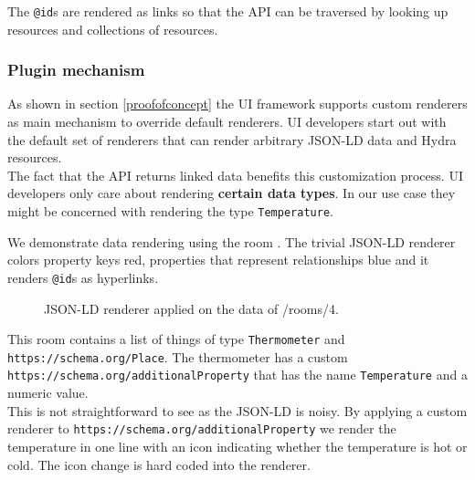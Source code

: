 The \lstinline{@id}s are rendered as links so that the API can be traversed by looking up resources and collections of resources.

\subsubsection{Plugin mechanism}\label{pluginmechanism}
As shown in section \ref{proofofconcept} the UI framework supports custom renderers as main mechanism to override default renderers. UI developers start out with the default set of renderers that can render arbitrary JSON-LD data and Hydra resources. \\
The fact that the API returns linked data benefits this customization process. UI developers only care about rendering \textbf{certain data types}. In our use case they might be concerned with rendering the type \lstinline{Temperature}.

We demonstrate data rendering using the room . The trivial JSON-LD renderer colors property keys red, properties that represent relationships blue and it renders \lstinline{@id}s as hyperlinks.

\begin{figure}[!htb]
  \caption{JSON-LD renderer applied on the data of /rooms/4.}
\end{figure}

This room contains a list of things of type \lstinline{Thermometer} and \lstinline{https://schema.org/Place}. The thermometer has a custom \lstinline{https://schema.org/additionalProperty} that has the name \lstinline{Temperature} and a numeric value. \\
This is not straightforward to see as the JSON-LD is noisy. By applying a custom renderer to \lstinline{https://schema.org/additionalProperty} we render the temperature in one line with an icon indicating whether the temperature is hot or cold. The icon change is hard coded into the renderer.

